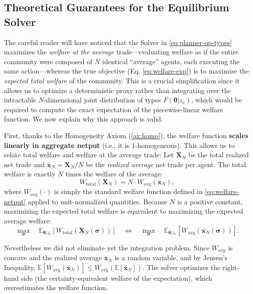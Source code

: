 \documentclass[12pt, notitlepage]{article}
\begin{document}
\subsection{Theoretical Guarantees for the Equilibrium Solver}

The careful reader will have noticed that the Solver in \cref{eq:planner-qp-types} maximizes the \textit{welfare at the average} trade---evaluating welfare as if the entire community were composed of $N$ identical ``average'' agents, each executing the same action---whereas the true objective (Eq. \ref{eq:welfare-exp}) is to maximize the \textit{expected total welfare} of the community. This is a crucial simplification since it allows us to optimize a deterministic proxy rather than integrating over the intractable $N$-dimensional joint distribution of types $F(\boldsymbol{\theta}|z_e)$, which would be required to compute the exact expectation of the piecewise-linear welfare function. We now explain why this approach is valid.

First, thanks to the Homogeneity Axiom (\cref{ax:homo}), the welfare function \textbf{scales linearly in aggregate netput} (i.e., it is 1-homogeneous). This allows us to relate total welfare and welfare at the average trade: Let $\mathbf{X}_N$ be the total realized net trade and $\bar{\mathbf{x}}_N = \mathbf{X}_N/N$ be the \emph{realized average} net trade per agent. The total welfare is exactly $N$ times the welfare of the average:
\[
W_{\text{total}}(\mathbf{X}_N) = N \cdot W_{\text{avg}}(\bar{\mathbf{x}}_N),
\]
where $W_{\text{avg}}(\cdot)$ is simply the standard welfare function defined in \cref{eq:welfare-netput} applied to unit-normalized quantities. Because $N$ is a positive constant, maximizing the expected total welfare is equivalent to maximizing the expected average welfare:
\[
\max_{\boldsymbol{\sigma}} \quad \mathbb{E}_{\boldsymbol{\theta}|z_e} \left[ W_{\text{total}}(\mathbf{X}_N(\boldsymbol{\sigma})) \right] \quad \iff \quad \max_{\boldsymbol{\sigma}} \quad \mathbb{E}_{\boldsymbol{\theta}|z_e} \left[ W_{\text{avg}}(\bar{\mathbf{x}}_N(\boldsymbol{\sigma})) \right].
\]

Nevertheless we did not eliminate yet the integration problem. Since $W_{\text{avg}}$ is concave and the realized average $\bar{\mathbf{x}}_N$ is a random variable, and by Jensen's Inequality,  $\mathbb{E}[W_{\text{avg}}(\bar{\mathbf{x}}_N)] \le W_{\text{avg}}(\mathbb{E}[\bar{\mathbf{x}}_N])$. The solver optimizes the right-hand side (the certainty-equivalent welfare of the expectation), which overestimates the welfare function.
\end{document}
